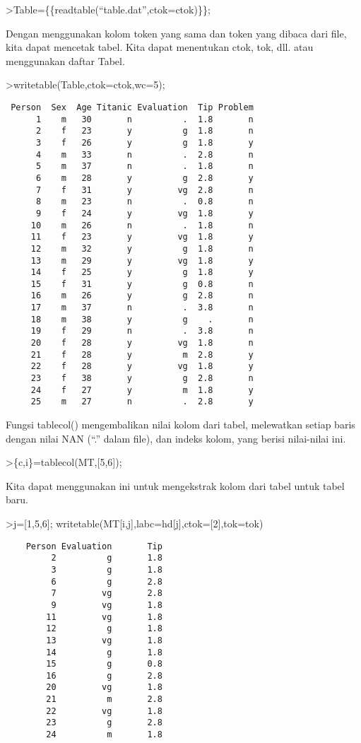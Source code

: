 \documentclass[
]{book}
\begin{document}
\textgreater Table=\{\{readtable(``table.dat'',ctok=ctok)\}\};

Dengan menggunakan kolom token yang sama dan token yang dibaca dari file, kita dapat mencetak tabel. Kita dapat menentukan ctok, tok, dll. atau menggunakan daftar Tabel.

\textgreater writetable(Table,ctok=ctok,wc=5);

\begin{verbatim}
 Person  Sex  Age Titanic Evaluation  Tip Problem
      1    m   30       n          .  1.8       n
      2    f   23       y          g  1.8       n
      3    f   26       y          g  1.8       y
      4    m   33       n          .  2.8       n
      5    m   37       n          .  1.8       n
      6    m   28       y          g  2.8       y
      7    f   31       y         vg  2.8       n
      8    m   23       n          .  0.8       n
      9    f   24       y         vg  1.8       y
     10    m   26       n          .  1.8       n
     11    f   23       y         vg  1.8       y
     12    m   32       y          g  1.8       n
     13    m   29       y         vg  1.8       y
     14    f   25       y          g  1.8       y
     15    f   31       y          g  0.8       n
     16    m   26       y          g  2.8       n
     17    m   37       n          .  3.8       n
     18    m   38       y          g    .       n
     19    f   29       n          .  3.8       n
     20    f   28       y         vg  1.8       n
     21    f   28       y          m  2.8       y
     22    f   28       y         vg  1.8       y
     23    f   38       y          g  2.8       n
     24    f   27       y          m  1.8       y
     25    m   27       n          .  2.8       y
\end{verbatim}

Fungsi tablecol() mengembalikan nilai kolom dari tabel, melewatkan setiap baris dengan nilai NAN (``.'' dalam file), dan indeks kolom, yang berisi nilai-nilai ini.

\textgreater\{c,i\}=tablecol(MT,{[}5,6{]});

Kita dapat menggunakan ini untuk mengekstrak kolom dari tabel untuk tabel baru.

\textgreater j={[}1,5,6{]}; writetable(MT{[}i,j{]},labc=hd{[}j{]},ctok={[}2{]},tok=tok)

\begin{verbatim}
    Person Evaluation       Tip
         2          g       1.8
         3          g       1.8
         6          g       2.8
         7         vg       2.8
         9         vg       1.8
        11         vg       1.8
        12          g       1.8
        13         vg       1.8
        14          g       1.8
        15          g       0.8
        16          g       2.8
        20         vg       1.8
        21          m       2.8
        22         vg       1.8
        23          g       2.8
        24          m       1.8
\end{verbatim}
\end{document}
